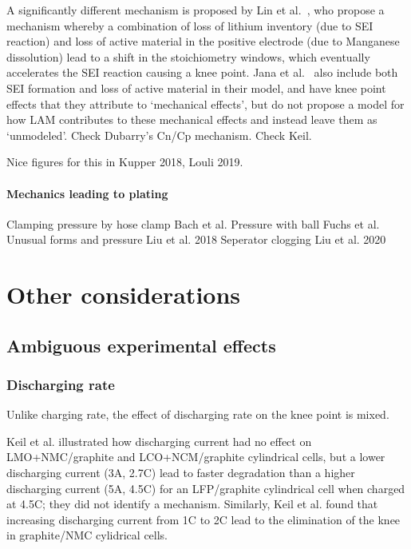 \documentclass{article}
\begin{document}
A significantly different mechanism is proposed by Lin et al.~\cite{lin_comprehensive_2013}, who propose a mechanism whereby a combination of loss of lithium inventory (due to SEI reaction) and loss of active material in the positive electrode (due to Manganese dissolution) lead to a shift in the stoichiometry windows, which eventually accelerates the SEI reaction causing a knee point.
Jana et al.~\cite{jana_physical_2019} also include both SEI formation and loss of active material in their model, and have knee point effects that they attribute to `mechanical effects', but do not propose a model for how LAM contributes to these mechanical effects and instead leave them as `unmodeled'.
Check Dubarry's Cn/Cp mechanism.
Check Keil.


Nice figures for this in Kupper 2018, Louli 2019.

\paragraph{Mechanics leading to plating}
Clamping pressure by hose clamp Bach et al. \cite{bach_nonlinear_2016}
Pressure with ball Fuchs et al.
Unusual forms and pressure Liu et al. 2018
Seperator clogging Liu et al. 2020

\section{Other considerations}

\subsection{Ambiguous experimental effects}

\subsubsection{Discharging rate}

Unlike charging rate, the effect of discharging rate on the knee point is mixed.

Keil et al.\cite{keil_charging_2016} illustrated how discharging current had no effect on LMO+NMC/graphite and LCO+NCM/graphite cylindrical cells, but a lower discharging current (3A, 2.7C) lead to faster degradation than a higher discharging current (5A, 4.5C) for an LFP/graphite cylindrical cell when charged at 4.5C; they did not identify a mechanism. 
Similarly, Keil et al.\cite{keil_linear_2019} found that increasing discharging current from 1C to 2C lead to the elimination of the knee in graphite/NMC cylidrical cells.
\end{document}
